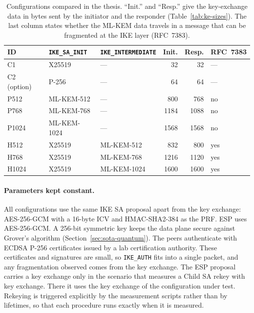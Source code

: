 \begin{table}[!h] \centering
    \footnotesize
    \caption{Configurations compared in the thesis. ``Init.'' and ``Resp.''
    give the key-exchange data in bytes sent by the initiator and the
    responder (Table~\ref{tab:ke-sizes}). The last column states whether the
    ML-KEM data travels in a message that can be fragmented at the IKE layer
    (RFC~7383).}
    \label{tab:configs}
    \begin{tabular}{| l | l | l | r | r | l |} \hline
        ID & \texttt{IKE\_SA\_INIT} & \texttt{IKE\_INTERMEDIATE} & Init. & Resp. & RFC~7383 \\ \hline\hline
        C1          & X25519      & ---         & 32   & 32   & --- \\ \hline
        C2 (option) & P-256       & ---         & 64   & 64   & --- \\ \hline
        P512        & ML-KEM-512  & ---         & 800  & 768  & no \\ \hline
        P768        & ML-KEM-768  & ---         & 1184 & 1088 & no \\ \hline
        P1024       & ML-KEM-1024 & ---         & 1568 & 1568 & no \\ \hline
        H512        & X25519      & ML-KEM-512  & 832  & 800  & yes \\ \hline
        H768        & X25519      & ML-KEM-768  & 1216 & 1120 & yes \\ \hline
        H1024       & X25519      & ML-KEM-1024 & 1600 & 1600 & yes \\ \hline
    \end{tabular}
\end{table}

\paragraph{Parameters kept constant.}
All configurations use the same IKE SA proposal apart from the key exchange:
AES-256-GCM with a 16-byte ICV and HMAC-SHA2-384 as the PRF. ESP uses
AES-256-GCM. A 256-bit symmetric key keeps the data plane secure against
Grover's algorithm (Section~\ref{sec:sota-quantum}). The peers authenticate
with ECDSA P-256 certificates issued by a lab certification authority. These
certificates and signatures are small, so \texttt{IKE\_AUTH} fits into
a single packet, and any fragmentation observed comes from the key exchange.
The ESP proposal carries a key exchange only in the scenario that measures
a Child SA rekey with key exchange. There it uses the key exchange of the
configuration under test. Rekeying is triggered explicitly by the measurement
scripts rather than by lifetimes, so that each procedure runs exactly when it
is measured.


